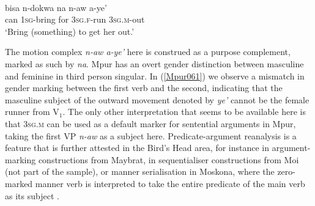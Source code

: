 \ea \label{Mpur061}
\\
\gll bisa n-dokwa na n-aw a-ye' \\
can \textsc{1}\textsc{sg}-bring for \textsc{3}\textsc{sg}.\textsc{f}-run \textsc{3}\textsc{sg}.\textsc{m}-out \\
\glft `Bring (something) to get her out.'\\ 
\z

The motion complex \textit{n-aw a-ye'} here is construed as a purpose complement, marked as such by \textit{na}. Mpur has an overt gender distinction between masculine and feminine in third person singular. In (\ref{Mpur061}) we observe a mismatch in gender marking between the first verb and the second, indicating that the masculine subject of the outward movement denoted by \textit{ye'} cannot be the female runner from V$_{1}$. The only other interpretation that seems to be available here is that \textsc{3sg.m} can be used as a default marker for sentential arguments in Mpur, taking the first VP \textit{n-aw} as a subject here. Predicate-argument reanalysis is a feature that is further attested in the Bird's Head area, for instance in argument-marking constructions from Maybrat, in sequentialiser constructions from Moi (not part of the sample), or manner serialisation in Moskona, where the zero-marked manner verb is interpreted to take the entire predicate of the main verb as its subject \citep[299f.]{gravelle2010grammar}. 

